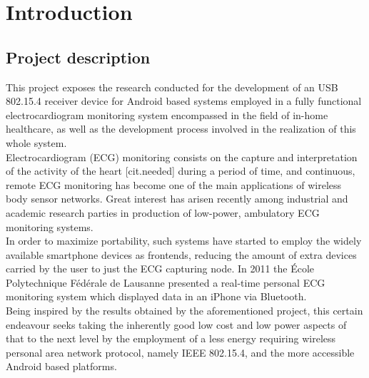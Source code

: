\chapter{Introduction}
\label{cha:intro}
	\section{Project description}

		This project exposes the research conducted for the development of an USB 802.15.4 receiver device for Android based systems employed in a fully functional electrocardiogram monitoring system encompassed in the field of in-home healthcare, as well as the development process involved in the realization of this whole system.\\ %

		Electrocardiogram (ECG) monitoring consists on the capture and interpretation of the activity of the heart [cit.needed] during a period of time, and continuous, remote ECG monitoring has become one of the main applications of wireless body sensor networks. Great interest has arisen recently among industrial and academic research parties in production of low-power, ambulatory ECG monitoring systems.\\

		In order to maximize portability, such systems have started to employ the widely available smartphone devices as frontends, reducing the amount of extra devices carried by the user to just the ECG capturing node. In 2011 the École Polytechnique Fédérale de Lausanne presented a real-time personal ECG monitoring system which displayed data in an iPhone via Bluetooth.\\

		Being inspired by the results obtained by the aforementioned project, this certain  endeavour seeks taking the inherently good low cost and low power aspects of that to the next level by the employment of a less energy requiring wireless personal area network protocol, namely IEEE 802.15.4, and the more accessible Android based platforms.\\

